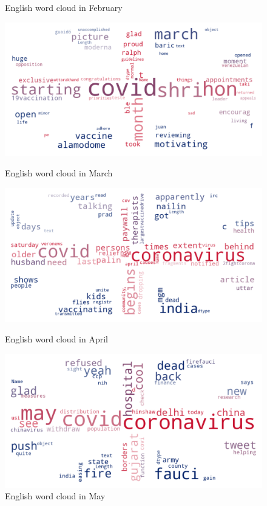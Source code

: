 \begin{landscape}
\begin{figure}[!htb]
  \caption{English word cloud in February}\label{fig:februaryUK}
\endminipage
\end{figure}
\begin{figure}[!htb]
  \includegraphics[width=\linewidth]{March en word cloud.png}
  \caption{English word cloud in March}\label{fig:marchUK}
\endminipage\hfill
{}
  \includegraphics[width=\linewidth]{April en word cloud.png}
  \caption{English word cloud in April}\label{fig:aprilUK}
\endminipage\hfill
{}
  \includegraphics[width=\linewidth]{May en word cloud.png}
  \caption{English word cloud in May}\label{fig:mayUK}
\endminipage
\end{figure}



\end{landscape}
